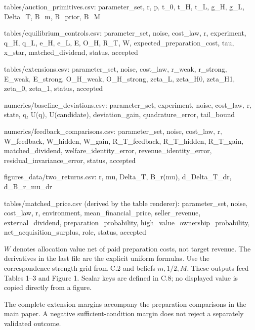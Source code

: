\documentclass[
  11pt,
]{article}
\newenvironment{Shaded}{}{}
\newcommand{\NormalTok}[1]{#1}
\begin{document}
\begin{Shaded}
\begin{Highlighting}[]
\NormalTok{tables/auction\_primitives.csv:}
\NormalTok{parameter\_set, r, p, t\_0, t\_H, t\_L, g\_H, g\_L, Delta\_T, B\_m, B\_prior, B\_M}

\NormalTok{tables/equilibrium\_controls.csv:}
\NormalTok{parameter\_set, noise, cost\_law, r, experiment, q\_H, q\_L,}
\NormalTok{e\_H, e\_L, E, O\_H, R\_T, W, expected\_preparation\_cost,}
\NormalTok{tau, x\_star, matched\_dividend, status, accepted}

\NormalTok{tables/extensions.csv:}
\NormalTok{parameter\_set, noise, cost\_law, r\_weak, r\_strong,}
\NormalTok{E\_weak, E\_strong, O\_H\_weak, O\_H\_strong,}
\NormalTok{zeta\_L, zeta\_H0, zeta\_H1, zeta\_0, zeta\_1, status, accepted}

\NormalTok{numerics/baseline\_deviations.csv:}
\NormalTok{parameter\_set, experiment, noise, cost\_law, r, state, q,}
\NormalTok{U(q), U(candidate), deviation\_gain, quadrature\_error, tail\_bound}

\NormalTok{numerics/feedback\_comparisons.csv:}
\NormalTok{parameter\_set, noise, cost\_law, r,}
\NormalTok{W\_feedback, W\_hidden, W\_gain,}
\NormalTok{R\_T\_feedback, R\_T\_hidden, R\_T\_gain, matched\_dividend,}
\NormalTok{welfare\_identity\_error, revenue\_identity\_error,}
\NormalTok{residual\_invariance\_error, status, accepted}

\NormalTok{figures\_data/two\_returns.csv:}
\NormalTok{r, mu, Delta\_T, B\_r(mu), d\_Delta\_T\_dr, d\_B\_r\_mu\_dr}

\NormalTok{tables/matched\_price.csv (derived by the table renderer):}
\NormalTok{parameter\_set, noise, cost\_law, r, environment, mean\_financial\_price,}
\NormalTok{seller\_revenue, external\_dividend, preparation\_probability,}
\NormalTok{high\_value\_ownership\_probability, net\_acquisition\_surplus, role, status, accepted}
\end{Highlighting}
\end{Shaded}

\(W\) denotes allocation value net of paid preparation costs, not target
revenue. The derivatives in the last file are the explicit uniform
formulas. Use the correspondence strength grid from C.2 and beliefs
\(m,1/2,M\). These outputs feed Tables 1--3 and Figure 1. Scalar keys
are defined in C.8; no displayed value is copied directly from a figure.

The complete extension margins accompany the preparation comparisons in
the main paper. A negative sufficient-condition margin does not reject a
separately validated outcome.
\end{document}
